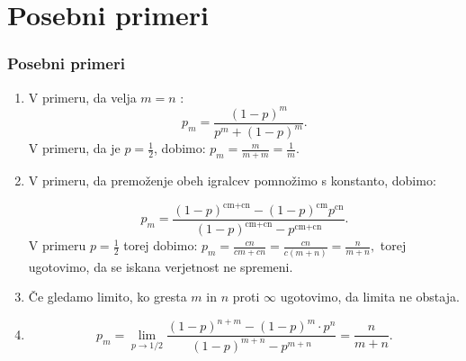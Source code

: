 \documentclass[10pt]{beamer}
\begin{document}
\section[Posebni primeri]{Posebni primeri}
\begin{frame}
\frametitle{Posebni primeri}
\begin{enumerate}
\item V primeru, da velja $m = n$ : $$p_m = \frac{(1-p)^m}{p^m+(1-p)^m}.$$
V primeru, da je $p = \frac{1}{2}$, dobimo: 
$p_m = \frac{m}{m + m} = \frac{1}{m}.$
\item V primeru, da premoženje obeh igralcev pomnožimo s konstanto, dobimo:

$$p_m = \frac{(1-p)^{\text{cm}+\text{cn}}-(1-p)^{\text{cm}} p^{\text{cn}}}{(1-p)^{\text{cm}+\text{cn}}-p^{\text{cm}+\text{cn}}}.$$
V primeru $p = \frac{1}{2}$ torej dobimo: 
$p_m = \frac{cn}{cm + cn} = \frac{cn}{c(m + n)} = \frac{n}{m + n},$ torej ugotovimo, da se iskana verjetnost ne spremeni. 

\item Če gledamo limito, ko gresta $m$ in $n$ proti $\infty$ ugotovimo, da limita ne obstaja.
\item $$p_m = \lim_{p \to 1/2}  \frac{(1-p)^{n+m} - (1-p)^m \cdot p^n}{(1-p)^{m+n} - p^{m+n}}  =\frac{n}{m + n}.$$
\end{enumerate}
\end{frame}
\end{document}
